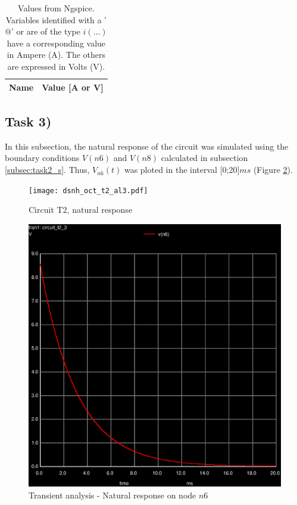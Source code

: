 \begin{table}[H]
	\centering
	\begin{tabular}{|l|r|}
		\hline    
		{\bf Name} & {\bf Value [A or V]} \\ \hline
    		
	\end{tabular}
	
	\caption{Values from Ngspice. Variables identified with a '$@$' or are of the type
	$i(...)$ have a corresponding value in Ampere (A). The others are expressed in Volts (V).}
    
\label{tab:op2}
\end{table}


\subsection{Task 3)}
\label{subsec:task3_s}

In this subsection, the natural response of the circuit was simulated using the boundary conditions
$V(n6)$ and $V(n8)$ calculated in subsection \ref{subsec:task2_s}. Thus, $V_{n6}(t)$ was ploted in the 
interval [0;20]$ms$ (Figure \ref{fig:trans-1}).

\begin{figure}[H]
	\centering
	\texttt{[image: dsnh\_oct\_t2\_al3.pdf]}
	\caption{Circuit T2, natural response}
\label{fig:Dsnh_sim_t2}
\end{figure}


\begin{figure}[H]
	\centering
	\includegraphics[width=0.7\linewidth]{trans-1.eps}
	\caption{Transient analysis - Natural response on node $n6$}
\label{fig:trans-1}
\end{figure}




